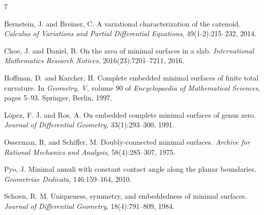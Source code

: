 \documentclass[11pt]{amsart}
\numberwithin{equation}{section}
\theoremstyle{theorem}
\theoremstyle{definition}
\numberwithin{equation}{section}
\begin{document}
\begin{thebibliography}{7}

Bernstein, J. and Breiner, C.
A variational characterization of the catenoid.
\textit{Calculus of Variations and Partial Differential Equations}, 49(1-2):215--232, 2014.

Choe, J. and Daniel, B.
On the area of minimal surfaces in a slab.
\textit{International Mathematics Research Notices}, 2016(23):7201--7211, 2016.

Hoffman, D. and Karcher, H.
Complete embedded minimal surfaces of finite total curvature.
In \textit{Geometry, V}, volume 90 of \textit{Encyclopaedia of Mathematical Sciences}, pages 5--93. Springer, Berlin, 1997.

L{\'o}pez, F. J. and Ros, A.
On embedded complete minimal surfaces of genus zero.
\textit{Journal of Differential Geometry}, 33(1):293--300, 1991.

Osserman, R. and Schiffer, M.
Doubly-connected minimal surfaces.
\textit{Archive for Rational Mechanics and Analysis}, 58(4):285--307, 1975.

Pyo, J.
Minimal annuli with constant contact angle along the planar boundaries.
\textit{Geometriae Dedicata}, 146:159--164, 2010.

Schoen, R. M.
Uniqueness, symmetry, and embeddedness of minimal surfaces.
\textit{Journal of Differential Geometry}, 18(4):791--809, 1984.

\end{thebibliography}
\end{document}
